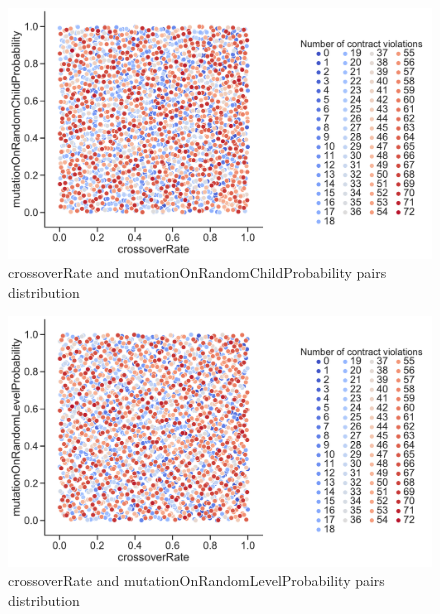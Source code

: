 \begin{figure}
	\centering
	\includegraphics[width=\textwidth]{images/PairsDistr/crossoverRate_mutationOnRandomChildProbability.pdf}
	\caption[crossoverRate and mutationOnRandomChildProbability pairs distribution]{crossoverRate and mutationOnRandomChildProbability pairs distribution}
	\label{fig:crossoverRate_mutationOnRandomChildProbability_pair}
\end{figure}
\begin{figure}
	\centering
	\includegraphics[width=\textwidth]{images/PairsDistr/crossoverRate_mutationOnRandomLevelProbability.pdf}
	\caption[crossoverRate and mutationOnRandomLevelProbability pairs distribution]{crossoverRate and mutationOnRandomLevelProbability pairs distribution}
	\label{fig:crossoverRate_mutationOnRandomLevelProbability_pair}
\end{figure}
